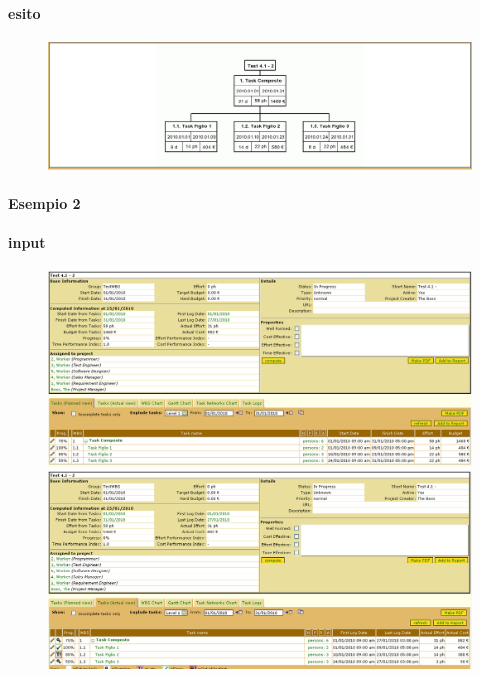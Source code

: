 \paragraph{esito}
\begin{figure}
\centering
\includegraphics[width=\textwidth]{tests/TEST_WBS/4.1/4.1_2/Esempio_1/output.png}
\end{figure}

\paragraph{Esempio 2}
\paragraph{input}
\begin{figure}
\centering
\includegraphics[width=\textwidth]{tests/TEST_WBS/4.1/4.1_2/Esempio_2/input.png}
\includegraphics[width=\textwidth]{tests/TEST_WBS/4.1/4.1_2/Esempio_2/input_actual.png}
\end{figure}
